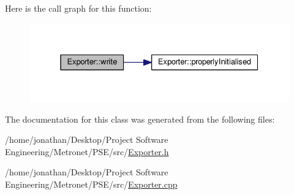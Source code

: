 Here is the call graph for this function\+:
\nopagebreak
\begin{figure}[H]
\begin{center}
\leavevmode
\includegraphics[width=331pt]{class_exporter_ac095b6486da16ffc76539f8c6c67be70_cgraph}
\end{center}
\end{figure}




The documentation for this class was generated from the following files\+:\begin{DoxyCompactItemize}
\item 
/home/jonathan/\+Desktop/\+Project Software Engineering/\+Metronet/\+P\+S\+E/src/\hyperlink{_exporter_8h}{Exporter.\+h}\item 
/home/jonathan/\+Desktop/\+Project Software Engineering/\+Metronet/\+P\+S\+E/src/\hyperlink{_exporter_8cpp}{Exporter.\+cpp}\end{DoxyCompactItemize}
